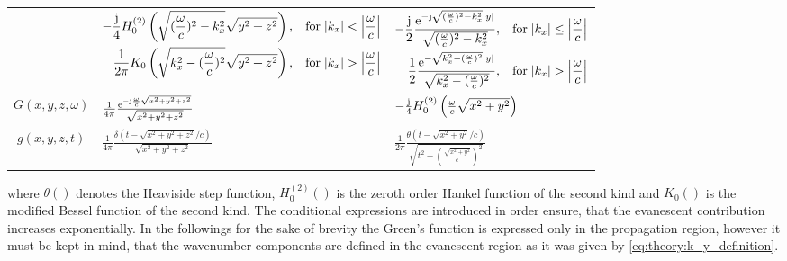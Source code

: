 \begin{center}
\begin{tabular}{  c | | l |	 l }
{    }     
    &      
    \scriptsize
    $\begin{aligned}[t] %
	-\frac{\ti}{4} H_0^{(2)}\left( \sqrt{(\frac{\omega}{c})^2 - k_x^2 } \sqrt{y^2+z^2} \right),\hspace{3mm} \text{for} \hspace{1mm}|k_x|<\left| \frac{\omega}{c} \right| \\ \frac{1}{2\pi} K_0\left( \sqrt{k_x^2 - (\frac{\omega}{c})^2 } \sqrt{y^2+z^2} \right),\hspace{3mm}  \text{for} \hspace{1mm}|k_x|>\left| \frac{\omega}{c} \right| 
	\end{aligned}$ \normalsize
     &     
     \scriptsize	$\begin{aligned}[t]
	-\frac{\ti}{2}\frac{\te^{-\ti\sqrt{(\frac{\omega}{c})^2 - k_x^2 }|y|}}{\sqrt{(\frac{\omega}{c})^2 - k_x^2 }},\hspace{3mm} \text{for} \hspace{1mm}|k_x|		\leq			\left| \frac{\omega}{c} \right| \\
	\frac{1}{2}\frac{\te^{- \sqrt{k_x^2 -(\frac{\omega}{c})^2}|y|}}{\sqrt{k_x^2 -(\frac{\omega}{c})^2}},\hspace{3mm}  \text{for} \hspace{1mm}|k_x|>\left| 					\frac{\omega}{c} \right| 
	\end{aligned}$ \normalsize      \\ 
    $G(x,y,z,\omega)$ 				 &  $\frac{1}{4\pi}\frac{\mathrm{e}^{-\mathrm{j}\frac{\omega}{c}\sqrt{x^2+y^2+z^2}}}{\sqrt{x^2+y^2+z^2}}$ & \scriptsize$-\frac{\mathrm{j}}{4} H_0^{(2)}\left( \frac{\omega}{c} \sqrt{x^2+y^2} \right) $\normalsize  \\ 
    $g(x,y,z,t)$ 					 &  $\frac{1}{4\pi}\frac{\delta\left( t - \sqrt{x^2+y^2+z^2}/c \right)}{\sqrt{x^2+y^2+z^2}}$  & $\frac{1}{2\pi}\frac{\theta(t - \sqrt{x^2+y^2}/c)}{\sqrt{t^2 - \left(\frac{\sqrt{x^2+y^2}}{c}\right)^2}}$
\label{eq:theory:Greens_fun_representations} 
    \end{tabular}
\end{center}
where $\theta\left( \right)$ denotes the Heaviside step function, $H_0^{(2)}\left( \right)$ is the zeroth order Hankel function of the second kind and $K_0\left( \right)$ is the modified Bessel function of the second kind.
The conditional expressions are introduced in order ensure, that the evanescent contribution increases exponentially. In the followings for the sake of brevity the Green's function is expressed only in the propagation region, however it must be kept in mind, that the wavenumber components are defined in the evanescent region as it was given by \eqref{eq:theory:k_y_definition}.

